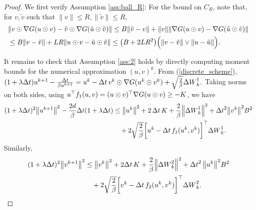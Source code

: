 \documentclass[11pt, twoside]{report}
\begin{document}
\begin{proof}%
We first verify Assumption \ref{ass:ball_R}:
For the bound on $C_R$,  note that, for $v,\tilde{v}$ such that $\|v\|\leq R,\|\tilde{v}\|\leq R$,
\begin{align*}
   & \norm{v \odot\nabla G(u\odot v) -\tilde v \odot\nabla G(\tilde u\odot \tilde v)}
\leq \cinfty \norm{\tilde v - v} + \norm{v} \norm{\nabla G(u\odot v) - \nabla G(\tilde u\odot \tilde v)}\\
&\leq \cinfty\norm{v-\tilde v} + \clip R\norm{u\odot v-\tilde u\odot \tilde v}
\leq \pa{\cinfty + 2 \clip R^2} \Bigl(\norm{v-\tilde v} \vee\norm{u-\tilde u}\Bigr).
\end{align*}



It remains to check that Assumption \ref{ass:2} holds by directly computing  moment bounds for the numerical approximation $(u,v)^k$. From (\ref{discrete_scheme}),
$
   (1+\lambda {\Delta t}) u^{k+1} - \frac{{\Delta t}}{\beta u^{k+1}}
     =  u^k - {\Delta t}\, v^k \odot \nabla G(u^k\odot v^k) +\sqrt{\frac2\beta}{\Delta W}^1_k.
$
Taking norms on both sides, using $u^\top f_1(u,v)= (u \odot v)^\top \nabla G(u \odot v)\ge -K$, we have
\begin{align*}
      (1+\lambda \deltat)^2\norm{ u^{k+1} }^2  - \frac{2d}{\beta}\deltat (1+\lambda \deltat) 
      &\leq 
       \norm{u^k}^2 + 2\,\deltat\,\ccc + \frac{2}{\beta}\norm{\deltaw^1_k}^2 + \deltat^2 \norm{v^k}^2 \cinfty^2 \\
       & \quad + 2\sqrt{\frac{2}{\beta}}\bp{u^k - \deltat \,f_1(u^k,v^k)\vphantom{\int}}^\top\deltaw^1_k.
  \end{align*}
  Similarly, 
  \begin{align*}    (1+\lambda \deltat)^2 \norm{v^{k+1}}^2 & \leq \norm{v^k}^2 + 2\deltat \,\ccc \nonumber+ \frac{2}{\beta}\norm{\deltaw^2_k}^2 + \deltat^2\, \norm{u^k}^2 \cinfty^2 \\
  & \quad + 2\sqrt{\frac{2}{\beta}}\bp{v^k - \deltat \,f_2(u^k,v^k)\vphantom{\int}}^\top\deltaw^2_k.
  \end{align*}


\end{proof}
\end{document}

